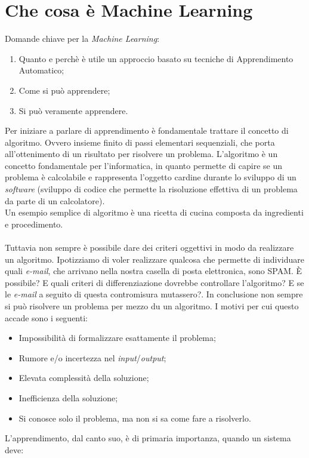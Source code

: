 \documentclass[10pt,a4paper]{book}
\begin{document}
\section{Che cosa \`e Machine Learning}
Domande chiave per la \textit{Machine Learning}:
\begin{enumerate}
\item Quanto e perch\`e \`e utile un approccio basato su tecniche di Apprendimento Automatico;
\item Come si pu\`o apprendere;
\item Si pu\`o veramente apprendere.
\end{enumerate}
\noindent
Per iniziare a parlare di apprendimento \`e fondamentale trattare il concetto di algoritmo. Ovvero insieme finito di passi elementari sequenziali, che porta all'ottenimento di un risultato per risolvere un problema. L'algoritmo \`e un concetto fondamentale per l'informatica, in quanto permette di capire se un problema \`e calcolabile e rappresenta l'oggetto cardine durante lo sviluppo di un \textit{software} (sviluppo di codice che permette la risoluzione effettiva di un problema da parte di un calcolatore).\\
Un esempio semplice di algoritmo \`e una ricetta di cucina composta da ingredienti e procedimento.\\\\
Tuttavia non sempre \`e possibile dare dei criteri oggettivi in modo da realizzare un algoritmo. Ipotizziamo di voler realizzare qualcosa che permette di individuare quali \textit{e-mail}, che arrivano nella nostra casella di posta elettronica, sono SPAM. \`E possibile? E quali criteri di differenziazione dovrebbe controllare l'algoritmo? E se le \textit{e-mail} a seguito di questa contromisura mutassero?. In conclusione non sempre si pu\`o risolvere un problema per mezzo du un algoritmo. I motivi per cui questo accade sono i seguenti:
\begin{itemize}
\item Impossibilit\`a di formalizzare esattamente il problema;
\item Rumore e/o incertezza nel \textit{input}/\textit{output};
\item Elevata complessit\`a della soluzione;
\item Inefficienza della soluzione;
\item Si conosce solo il problema, ma non si sa come fare a risolverlo.
\end{itemize}
\noindent
L'apprendimento, dal canto suo, \`e di primaria importanza, quando un sistema deve:
\end{document}
